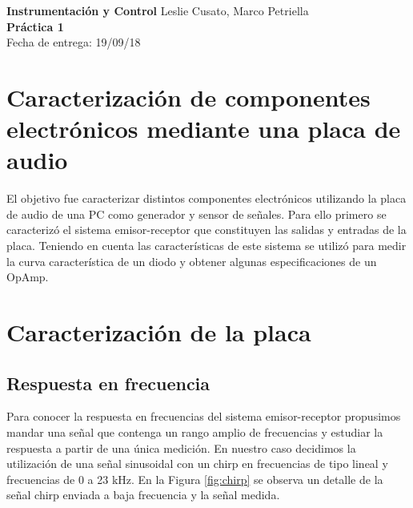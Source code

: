 \documentclass[a4paper, 11pt]{article}
\begin{document}
\noindent
\large\textbf{Instrumentación y Control} \hfill  Leslie Cusato, Marco Petriella\\
\textbf{Práctica 1}   \\
Fecha de entrega: 19/09/18 \\


\section*{Caracterización de componentes electrónicos mediante una placa de audio }
El objetivo fue caracterizar distintos componentes electrónicos utilizando la placa de audio de una PC como generador y sensor de señales. Para ello primero se caracterizó el sistema emisor-receptor que constituyen las salidas y entradas de la placa. Teniendo en cuenta las características de este sistema se utilizó para medir la curva característica de un diodo y obtener algunas especificaciones de un OpAmp.%

\section*{Caracterización de la placa}
\subsection*{Respuesta en frecuencia}
Para conocer la respuesta en frecuencias del sistema emisor-receptor propusimos mandar una señal que contenga un rango amplio de frecuencias y estudiar la respuesta a partir de una única medición. En nuestro caso decidimos la utilización de una señal sinusoidal con un chirp en frecuencias de tipo lineal y frecuencias de 0 a 23 kHz. En la Figura  \ref{fig:chirp} se observa un detalle de la señal chirp enviada a baja frecuencia y la señal medida. 
\end{document}
